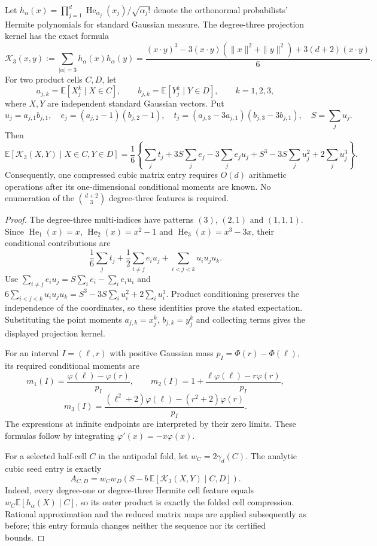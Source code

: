 \begin{proposition}
\label{prop:new-compact-cubic-cell-entry}
Let $h_\alpha(x)=\prod_{j=1}^d
\operatorname{He}_{\alpha_j}(x_j)/\sqrt{\alpha_j!}$ denote the
orthonormal probabilists' Hermite polynomials for standard Gaussian
measure. The degree-three projection kernel has the exact formula
\[
 \mathcal K_3(x,y):=\sum_{|\alpha|=3}h_\alpha(x)h_\alpha(y)
 =\frac{(x\cdot y)^3-3(x\cdot y)(\|x\|^2+\|y\|^2)
                  +3(d+2)(x\cdot y)}6.
\]
For two product cells $C,D$, let
\[
 a_{j,k}=\mathbb E[X_j^k\mid X\in C],\qquad
 b_{j,k}=\mathbb E[Y_j^k\mid Y\in D],\qquad k=1,2,3,
\]
where $X,Y$ are independent standard Gaussian vectors. Put
\[
 u_j=a_{j,1}b_{j,1},\quad
 e_j=(a_{j,2}-1)(b_{j,2}-1),\quad
 t_j=(a_{j,3}-3a_{j,1})(b_{j,3}-3b_{j,1}),\quad S=\sum_j u_j.
\]
Then
\[
 \mathbb E[\mathcal K_3(X,Y)\mid X\in C,Y\in D]
 =\frac16\left\{
 \sum_j t_j+3S\sum_j e_j-3\sum_j e_ju_j
          +S^3-3S\sum_j u_j^2+2\sum_j u_j^3\right\}.
\]
Consequently, one compressed cubic matrix entry requires $O(d)$
arithmetic operations after its one-dimensional conditional moments are
known. No enumeration of the $\binom{d+2}{3}$ degree-three features is
required.
\end{proposition}
\begin{proof}
The degree-three multi-indices have patterns $(3)$, $(2,1)$ and
$(1,1,1)$. Since $\operatorname{He}_1(x)=x$,
$\operatorname{He}_2(x)=x^2-1$ and
$\operatorname{He}_3(x)=x^3-3x$, their conditional contributions are
\[
 \frac16\sum_j t_j
 +\frac12\sum_{i\ne j}e_i u_j
 +\sum_{i<j<k}u_i u_j u_k.
\]
Use $\sum_{i\ne j}e_i u_j=S\sum_i e_i-\sum_i e_i u_i$ and
$6\sum_{i<j<k}u_i u_j u_k
 =S^3-3S\sum_i u_i^2+2\sum_i u_i^3$.
Product conditioning preserves the independence of the coordinates,
so these identities prove the stated expectation. Substituting the
point moments $a_{j,k}=x_j^k$, $b_{j,k}=y_j^k$ and collecting terms
gives the displayed projection kernel.

For an interval $I=(\ell,r)$ with positive Gaussian mass
$p_I=\Phi(r)-\Phi(\ell)$, its required conditional moments are
\[
 m_1(I)=\frac{\varphi(\ell)-\varphi(r)}{p_I},\qquad
 m_2(I)=1+\frac{\ell\varphi(\ell)-r\varphi(r)}{p_I},
\]
\[
 m_3(I)=
 \frac{(\ell^2+2)\varphi(\ell)-(r^2+2)\varphi(r)}{p_I}.
\]
The expressions at infinite endpoints are interpreted by their zero
limits. These formulas follow by integrating
$\varphi'(x)=-x\varphi(x)$.

For a selected half-cell $C$ in the antipodal fold, let
$w_C=2\gamma_d(C)$. The analytic cubic seed entry is exactly
\[
 A_{C,D}=w_Cw_D\left(S-
 b\,\mathbb E[\mathcal K_3(X,Y)\mid C,D]\right).
\]
Indeed, every degree-one or degree-three Hermite cell feature equals
$w_C\mathbb E[h_\alpha(X)\mid C]$, so its outer product is exactly
the folded cell compression. Rational approximation and the reduced
matrix maps are applied subsequently as before; this entry formula
changes neither the sequence nor its certified bounds.
\end{proof}
